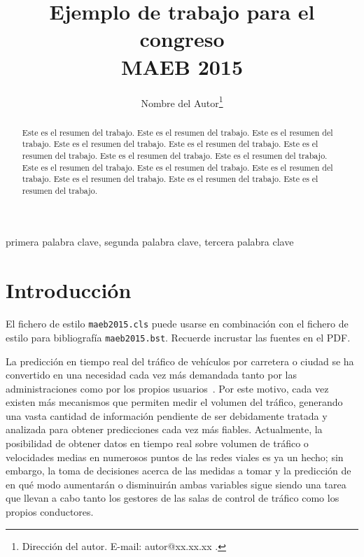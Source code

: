 \documentclass[twocolumn]{maeb2015}
\begin{document}
\title{Ejemplo de trabajo para el congreso \\MAEB 2015} %

\author{Nombre del Autor\thanks{Dirección del autor.
E-mail: autor@xx.xx.xx .}}

\maketitle

\begin{abstract}
Este es el resumen del trabajo.
Este es el resumen del trabajo.
Este es el resumen del trabajo.
Este es el resumen del trabajo.
Este es el resumen del trabajo.
Este es el resumen del trabajo.
Este es el resumen del trabajo.
Este es el resumen del trabajo.
Este es el resumen del trabajo.
Este es el resumen del trabajo.
Este es el resumen del trabajo.
Este es el resumen del trabajo.
Este es el resumen del trabajo.
Este es el resumen del trabajo.
\end{abstract}

\begin{keywords}
primera palabra clave, segunda palabra clave, tercera palabra clave
\end{keywords}

\section{Introducción}
El fichero de estilo {\tt maeb2015.cls} puede usarse en combinación
con el fichero de estilo para bibliografía {\tt maeb2015.bst}.
Recuerde incrustar las fuentes en el PDF.


La predicción en tiempo real del tráfico de vehículos por carretera o ciudad se ha convertido en una necesidad cada vez más demandada tanto por las administraciones como por los propios usuarios~\cite{Min2011606}. Por este motivo, cada vez existen más mecanismos que permiten medir el volumen del tráfico, generando una vasta cantidad de información pendiente de ser debidamente tratada y analizada para obtener predicciones cada vez más fiables. Actualmente, la posibilidad de obtener datos en tiempo real sobre volumen de tráfico o velocidades medias en numerosos puntos de las redes viales es ya un hecho; sin embargo, la toma de decisiones acerca de las medidas a tomar y la predicción de en qué modo aumentarán o disminuirán ambas variables sigue siendo una tarea que llevan a cabo tanto los gestores de las salas de control de tráfico como los propios conductores.
\end{document}
